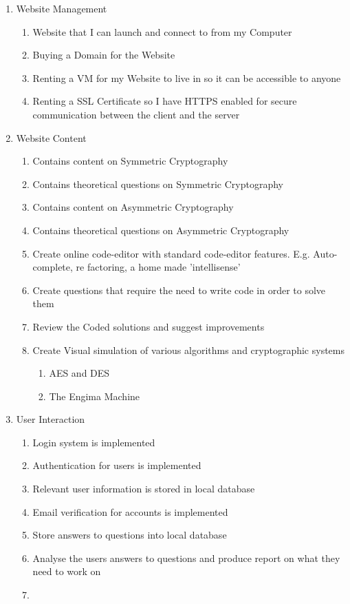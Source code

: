 \begin{enumerate}
\item{Website Management
	\begin{enumerate}
		\item{Website that I can launch and connect to from my Computer}
		\item{Buying a Domain for the Website}
		\item{Renting a VM for my Website to live in so it can be accessible to anyone}
		\item{Renting a SSL Certificate so I have HTTPS enabled for secure communication between the client and the server}
	\end{enumerate}
}
\item{Website Content
	\begin{enumerate}
		\item{Contains content on Symmetric Cryptography}
		\item{Contains theoretical questions on Symmetric Cryptography}
		\item{Contains content on Asymmetric Cryptography}
		\item{Contains theoretical questions on Asymmetric Cryptography}
		\item{Create online code-editor with standard code-editor features. E.g. Auto-complete, re factoring, a home made 'intellisense'}
		\item{Create questions that require the need to write code in order to solve them}
		\item{Review the Coded solutions and suggest improvements}
		\item{Create Visual simulation of various algorithms and cryptographic systems
			\begin{enumerate}
				\item{AES and DES}
				\item{The Engima Machine}
			\end{enumerate}					
		}
	\end{enumerate}
}
\item{User Interaction
	\begin{enumerate}
		\item{Login system is implemented}
		\item{Authentication for users is implemented}
		\item{Relevant user information is stored in local database}
		\item{Email verification for accounts is implemented}
		\item{Store answers to questions into local database}
		\item{Analyse the users answers to questions and produce report on what they need to work on}
		\item{}
	\end{enumerate}
}
\end{enumerate}

